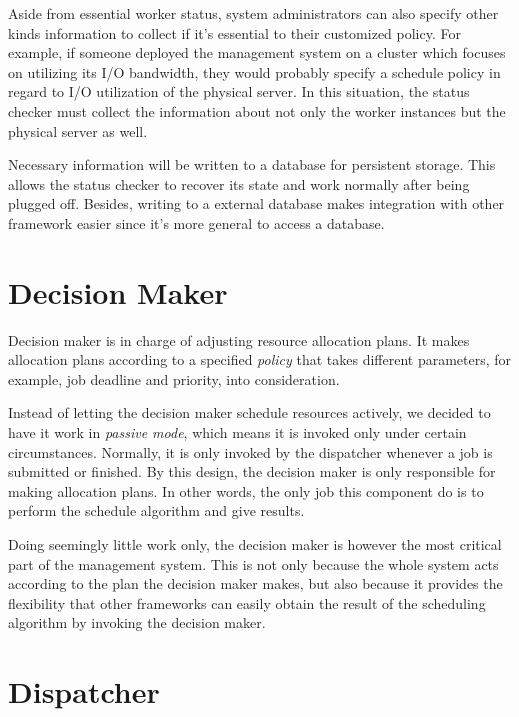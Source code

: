 Aside from essential worker status, system administrators can also
specify other kinds information to collect if it's essential to  their
customized policy.  For example, if someone deployed the management
system on a cluster which focuses on utilizing its I/O bandwidth, they
would probably specify a schedule policy in regard to I/O utilization of
the physical server.  In this situation, the status checker must collect
the information about not only the worker instances but the physical
server as well.

Necessary information will be written to a database for persistent
storage.  This allows the status checker to recover its state and work
normally after being plugged off.  Besides, writing to a external
database makes integration with other framework easier since it's more
general to access a database.

\section{Decision Maker}

Decision maker is in charge of adjusting resource allocation plans.  It
makes allocation plans according to a specified \emph{policy} that takes
different parameters, for example, job deadline and priority, into
consideration. 

Instead of letting the decision maker schedule resources actively, we
decided to have it work in \emph{passive mode}, which means it is
invoked only under certain circumstances.  Normally, it is only invoked
by the dispatcher whenever a job is submitted or finished.  By this
design, the decision maker is only responsible for making allocation
plans.  In other words, the only job this component do is to perform the
schedule algorithm and give results.  

Doing seemingly little work only, the decision maker is however the most
critical part of the management system. This is not only because the
whole system acts according to the plan the decision maker makes, but
also because it provides the flexibility that other frameworks can
easily obtain the result of the scheduling algorithm by invoking the
decision maker.

\section{Dispatcher}

